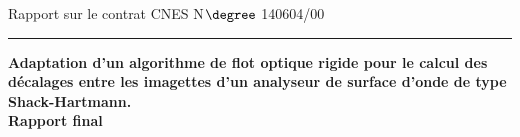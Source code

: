 


\rmfamily
\noindent
\thispagestyle{empty}

\begin{figure}
\centering
{} 
\hfill
{} 
\end{figure}





\begin{center}
    \huge
    Rapport sur le contrat CNES N$\degree$ 140604/00\\
\end{center}
\hrule
\begin{center}
    \Large\bfseries
     Adaptation d'un algorithme de flot optique rigide pour le calcul des d\'{e}calages entre les imagettes d'un analyseur de surface d'onde de type Shack-Hartmann.\\
    \large Rapport final
\end{center}

